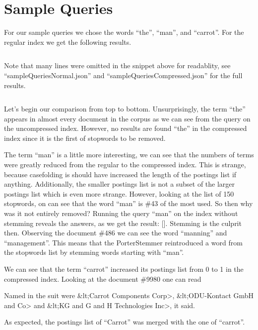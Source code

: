 \documentclass[]{article}
\begin{document}
\section{Sample Queries}
	For our sample queries we chose the words ``the'', ``man'', and ``carrot''. For the regular index we get the following results.
	\inputminted[]{json}{codesnippets/sampleQueriesNormal.txt}
	Note that many lines were omitted in the snippet above for readablity, see ``sampleQueriesNormal.json'' and ``sampleQueriesCompressed.json'' for the  full results.
	\inputminted[]{json}{codesnippets/sampleQueriesCompressed.txt}
	\par Let's begin our comparison from top to bottom. Unsurprisingly, the term ``the'' appears in almost every document in the corpus as we can see from the query on the uncompressed index. However, no results are found ``the'' in the compressed index since it is the first of stopwords to be removed.
	\par The term ``man'' is a little more interesting, we can see that the numbers of terms were greatly reduced from the regular to the compressed index. This is strange, because casefolding is should have increased the length of the postings list if anything. Additionally, the smaller postings list is not a subset of the larger postings list which is even more strange. However, looking at the list of 150 stopwords, on can see that the word ``man'' is \#43 of the most used. So then why was it not entirely removed? Running the query ``man'' on the index without stemming reveals the answers, as we get the result: []. Stemming is the culprit then. Observing the document \#486 we can see the word ``manning'' and ``management''. This means that the PorterStemmer reintroduced a word from the stopwords list by stemming words starting with ``man''.
	\par We can see that the term ``carrot'' increased its postings list from 0 to 1 in the compressed index. Looking at the document \#9980 one can read
	\begin{displayquote}
		Named in the suit were \&lt;Carrot
		Components Corp>, \&lt;ODU-Kontact GmbH and Co> and \&lt;KG and G and H
		Technologies Inc>, it said.
	\end{displayquote}
	As expected, the postings list of ``Carrot'' was merged with the one of ``carrot''.
	
\end{document}
